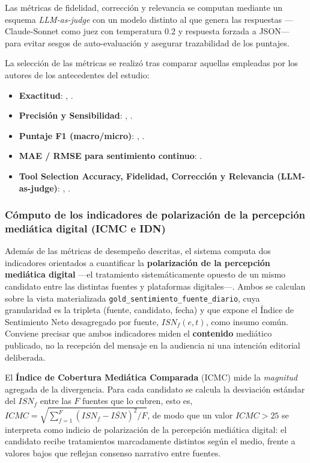 Las métricas de fidelidad, corrección y relevancia se computan mediante un esquema
\textit{LLM-as-judge} con un modelo distinto al que genera las respuestas
—Claude-Sonnet como juez con temperatura $0.2$ y respuesta forzada a JSON— para evitar
sesgos de auto-evaluación y asegurar trazabilidad de los puntajes.

La selección de las métricas se realizó tras comparar aquellas empleadas por los autores
de los antecedentes del estudio:

\begin{itemize}
    \item \textbf{Exactitud}: \cite{pr_alvi2023twitter_election_review}, \cite{pr_gujral2024llm_elections}.
    \item \textbf{Precisión y Sensibilidad}: \cite{pr_alvarez2023llm_political}, \cite{pr_alvi2023twitter_election_review}.
    \item \textbf{Puntaje F1 (macro/micro)}: \cite{pr_alvarez2023llm_political}, \cite{pr_chen2024combating_misinformation}.
    \item \textbf{MAE / RMSE para sentimiento continuo}: \cite{pr_alvarez2023llm_political}.
    \item \textbf{Tool Selection Accuracy, Fidelidad, Corrección y Relevancia (LLM-as-judge)}: \cite{pr_chen2024combating_misinformation}, \cite{pr_gujral2024llm_elections}.
\end{itemize}

\subsubsection*{Cómputo de los indicadores de polarización de la percepción mediática digital (ICMC e IDN)}

Además de las métricas de desempeño descritas, el sistema computa dos indicadores
orientados a cuantificar la \textbf{polarización de la percepción mediática digital} —el tratamiento
sistemáticamente opuesto de un mismo candidato entre las distintas fuentes y plataformas
digitales—. Ambos se calculan sobre la vista materializada
\texttt{gold\_sentimiento\_fuente\_diario}, cuya granularidad es la tripleta
(fuente, candidato, fecha) y que expone el Índice de Sentimiento Neto desagregado por
fuente, $ISN_f(e,t)$, como insumo común. Conviene precisar que ambos indicadores miden el
\textbf{contenido} mediático publicado, no la recepción del mensaje en la audiencia ni una
intención editorial deliberada.

El \textbf{Índice de Cobertura Mediática Comparada} (ICMC) mide la \textit{magnitud}
agregada de la divergencia. Para cada candidato se calcula la desviación estándar del
$ISN_f$ entre las $F$ fuentes que lo cubren, esto es,
$ICMC = \sqrt{\sum_{f=1}^{F}\left(ISN_f - \overline{ISN}\right)^2 / F}$, de modo que un valor
$ICMC > 25$ se interpreta como indicio de polarización de la percepción mediática digital: el candidato recibe
tratamientos marcadamente distintos según el medio, frente a valores bajos que reflejan
consenso narrativo entre fuentes.

